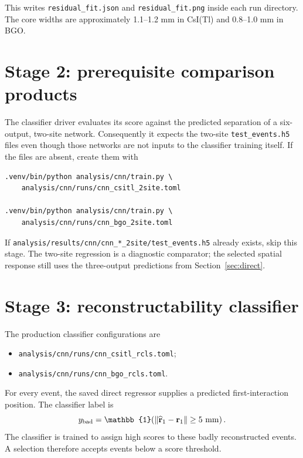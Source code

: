 \documentclass[11pt,a4paper]{article}
\newcommand{\code}[1]{\nolinkurl{#1}}
\newcommand{\csitl}{CsI(Tl)}
\begin{document}
This writes \code{residual\_fit.json} and \code{residual\_fit.png} inside each
run directory. The core widths are approximately 1.1--1.2 mm in \csitl{} and
0.8--1.0 mm in BGO.

\section{Stage 2: prerequisite comparison products}

The classifier driver evaluates its score against the predicted separation of
a six-output, two-site network. Consequently it expects the two-site
\code{test\_events.h5} files even though those networks are not inputs to the
classifier training itself. If the files are absent, create them with

\begin{verbatim}
.venv/bin/python analysis/cnn/train.py \
    analysis/cnn/runs/cnn_csitl_2site.toml

.venv/bin/python analysis/cnn/train.py \
    analysis/cnn/runs/cnn_bgo_2site.toml
\end{verbatim}

If \code{analysis/results/cnn/cnn\_*\_2site/test\_events.h5} already exists,
skip this stage. The two-site regression is a diagnostic comparator; the
selected spatial response still uses the three-output predictions from
Section~\ref{sec:direct}.

\section{Stage 3: reconstructability classifier}
\label{sec:classifier}

The production classifier configurations are
\begin{itemize}
  \item \code{analysis/cnn/runs/cnn\_csitl\_rcls.toml};
  \item \code{analysis/cnn/runs/cnn\_bgo\_rcls.toml}.
\end{itemize}
For every event, the saved direct regressor supplies a predicted
first-interaction position. The classifier label is
\begin{equation}
 y_{\rm bad}=\mathbb{1}\!\left(
 \|\widehat{\mathbf r}_1-\mathbf r_1\|\geq5\ {\rm mm}\right).
\end{equation}
The classifier is trained to assign high scores to these badly reconstructed
events. A selection therefore accepts events below a score threshold.
\end{document}
